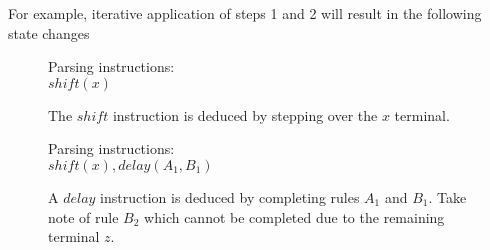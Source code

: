 \documentclass[a4paper,11pt]{article}
\begin{document}
For example, iterative application of steps 1 and 2 will result in the following state changes

\begin{figure}[!ht]
\begin{center}
\parbox{.3\textwidth}{}
\parbox{.65\textwidth}{Parsing instructions:\\$shift(x)$}
\caption{The $shift$ instruction is deduced by stepping over the $x$ terminal.}
\end{center}
\end{figure}

\begin{figure}[!ht]
\begin{center}
\parbox{.3\textwidth}{}
\parbox{.65\textwidth}{Parsing instructions:\\$shift(x), delay(A_1, B_1)$}
\caption{A $delay$ instruction is deduced by completing rules $A_1$ and $B_1$. Take note of rule $B_2$ which cannot be completed due to the remaining terminal $z$.}
\end{center}
\end{figure}
\end{document}
